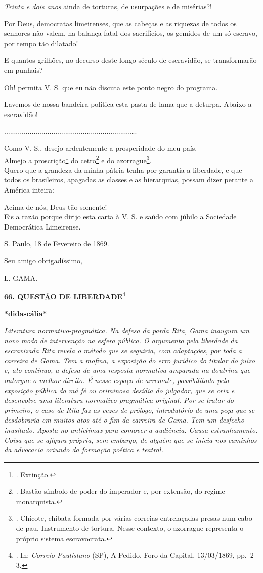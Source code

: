 \emph{Trinta e dois anos} ainda de torturas, de usurpações e de
misérias?!

Por Deus, democratas limeirenses, que as cabeças e as riquezas de todos
os senhores não valem, na balança fatal dos sacrifícios, os gemidos de
um só escravo, por tempo tão dilatado!

E quantos grilhões, no decurso deste longo século de escravidão, se
transformarão em punhais?

Oh! permita V. S. que eu não discuta este ponto negro do programa.

Lavemos de nossa bandeira política esta pasta de lama que a deturpa.
Abaixo a escravidão!

................................................................\ldots.

Como V. S., desejo ardentemente a prosperidade do meu país.\\
Almejo a proscrição\footnote{. Extinção.} do cetro\footnote{.
  Bastão-símbolo de poder do imperador e, por extensão, do regime
  monarquista.} e do azorrague\footnote{. Chicote, chibata formada por
  várias correias entrelaçadas presas num cabo de pau. Instrumento de
  tortura. Nesse contexto, o azorrague representa o próprio sistema
  escravocrata.}.\\
Quero que a grandeza da minha pátria tenha por garantia a liberdade, e
que todos os brasileiros, apagadas as classes e as hierarquias, possam
dizer perante a América inteira:

Acima de nós, Deus tão somente!\\
Eis a razão porque dirijo esta carta à V. S. e saúdo com júbilo a
Sociedade Democrática Limeirense.

S. Paulo, 18 de Fevereiro de 1869.

Seu amigo obrigadíssimo,

L. GAMA.

\textbf{66. QUESTÃO DE LIBERDADE}\footnote{. In: \emph{Correio
  Paulistano} (SP), A Pedido, Foro da Capital, 13/03/1869, pp.~2-3.}

\textbf{*didascália*}

\emph{Literatura normativo-pragmática. Na defesa da parda Rita, Gama
inaugura um novo modo de intervenção na esfera pública. O argumento pela
liberdade da escravizada Rita revela o método que se seguiria, com
adaptações, por toda a carreira de Gama. Tem a mofina, a exposição do
erro jurídico do titular do juízo e, ato contínuo, a defesa de uma
resposta normativa amparada na doutrina que outorgue o melhor direito. É
nesse espaço de arremate, possibilitado pela exposição pública da má fé
ou criminosa desídia do julgador, que se cria e desenvolve uma
literatura normativo-pragmática original. Por se tratar do primeiro, o
caso de Rita faz as vezes de prólogo, introdutório de uma peça que se
desdobraria em muitos atos até o fim da carreira de Gama. Tem um
desfecho inusitado. Aposta no anticlímax para comover a audiência. Causa
estranhamento. Coisa que se afigura própria, sem embargo, de alguém que
se inicia nos caminhos da advocacia oriundo da formação poética e
teatral.}

